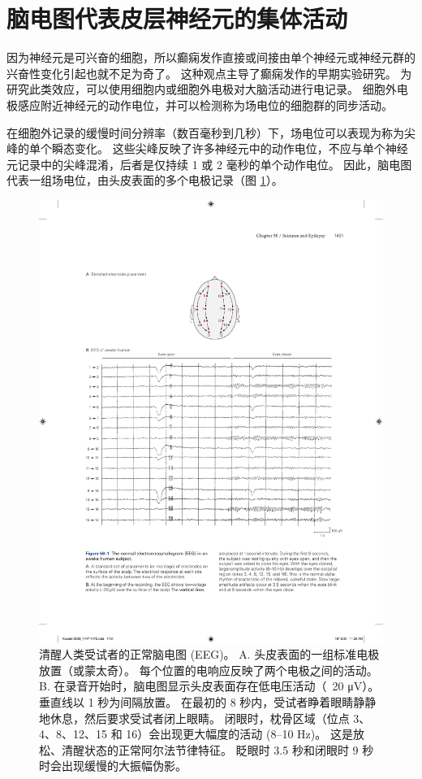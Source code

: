 \section{脑电图代表皮层神经元的集体活动}

因为神经元是可兴奋的细胞，所以癫痫发作直接或间接由单个神经元或神经元群的兴奋性变化引起也就不足为奇了。
这种观点主导了癫痫发作的早期实验研究。
为研究此类效应，可以使用细胞内或细胞外电极对大脑活动进行电记录。
细胞外电极感应附近神经元的动作电位，并可以检测称为场电位的细胞群的同步活动。


在细胞外记录的缓慢时间分辨率（数百毫秒到几秒）下，场电位可以表现为称为尖峰的单个瞬态变化。
这些尖峰反映了许多神经元中的动作电位，不应与单个神经元记录中的尖峰混淆，后者是仅持续 1 或 2 毫秒的单个动作电位。
因此，脑电图代表一组场电位，由头皮表面的多个电极记录（图 \ref{fig:58_1}）。


\begin{figure}[htbp]
	\centering
	\includegraphics[width=0.95\linewidth]{chap58/fig_58_1}
	\caption{清醒人类受试者的正常脑电图 (EEG)。 A. 头皮表面的一组标准电极放置（或蒙太奇）。 每个位置的电响应反映了两个电极之间的活动。 B. 在录音开始时，脑电图显示头皮表面存在低电压活动（~20 μV）。 垂直线以 1 秒为间隔放置。 在最初的 8 秒内，受试者睁着眼睛静静地休息，然后要求受试者闭上眼睛。 闭眼时，枕骨区域（位点 3、4、8、12、15 和 16）会出现更大幅度的活动 (8–10 Hz)。 这是放松、清醒状态的正常阿尔法节律特征。 眨眼时 3.5 秒和闭眼时 9 秒时会出现缓慢的大振幅伪影。}
	\label{fig:58_1}
\end{figure}


